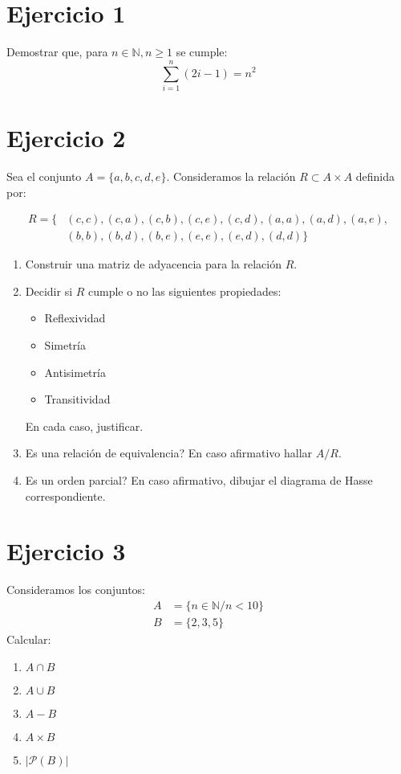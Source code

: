 \documentclass[12pt,a4paper]{article}
\begin{document}
\section*{Ejercicio 1}
Demostrar que, para $n \in \mathbb{N}, n \geq 1$ se cumple:
\begin{equation*}
  \sum_{i=1}^{n}{(2i-1)} = n^2
\end{equation*}

\section*{Ejercicio 2}
Sea el conjunto $A= \{ a,b,c,d,e\}$. Consideramos la relaci\'on
$R\subset A \times A$ definida por:

\begin{align*}
  R = \{&(c,c),(c,a),(c,b),(c,e),(c,d),(a,a),(a,d),(a,e),\\
     & (b,b),(b,d),(b,e),(e,e),(e,d),(d,d)
  \}
\end{align*}

\begin{enumerate}
\item
  Construir una matriz de adyacencia para la relaci\'on $R$.
\item
  Decidir si $R$ cumple o no las siguientes propiedades:
  \begin{itemize}
  \item Reflexividad
  \item Simetr\'ia
  \item Antisimetr\'ia
  \item Transitividad
  \end{itemize}
  En cada caso, justificar.
\item
  Es una relaci\'on de equivalencia? En caso afirmativo hallar
  $A/R$.
\item
  Es un orden parcial? En caso afirmativo, dibujar el diagrama de Hasse
  correspondiente.
\end{enumerate}

\newpage
\section*{Ejercicio 3}
Consideramos los conjuntos:
\begin{align*}
  A &= \{ n \in \mathbb{N} / n < 10\} \\
  B &= \{ 2,3,5 \}
\end{align*}
Calcular:
\begin{enumerate}
\item $A \cap B$
\item $A \cup B$
\item $A-B$
\item $A \times B$
\item $|\mathcal{P}(B)|$
\end{enumerate}
\end{document}
